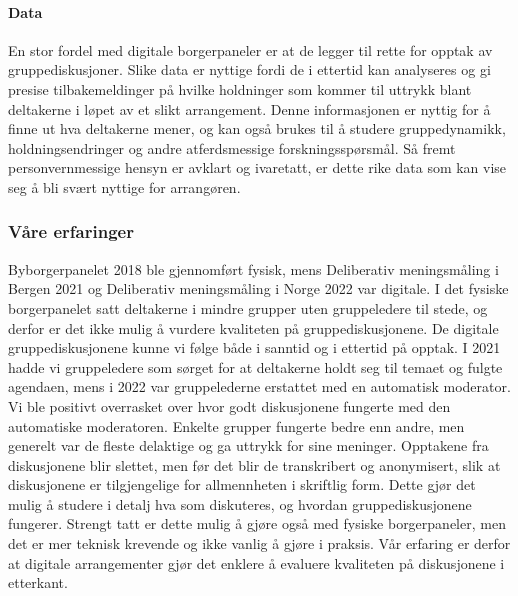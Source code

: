\documentclass[
  12pt,
  a4paper, 12pt]{article}
\begin{document}
\hypertarget{data}{%
\paragraph{Data}\label{data}}

En stor fordel med digitale borgerpaneler er at de legger til rette for opptak av gruppediskusjoner. Slike data er nyttige fordi de i ettertid kan analyseres og gi presise tilbakemeldinger på hvilke holdninger som kommer til uttrykk blant deltakerne i løpet av et slikt arrangement. Denne informasjonen er nyttig for å finne ut hva deltakerne mener, og kan også brukes til å studere gruppedynamikk, holdningsendringer og andre atferdsmessige forskningsspørsmål. Så fremt personvernmessige hensyn er avklart og ivaretatt, er dette rike data som kan vise seg å bli svært nyttige for arrangøren.

\hypertarget{vuxe5re-erfaringer-1}{%
\subsubsection{Våre erfaringer}\label{vuxe5re-erfaringer-1}}

Byborgerpanelet 2018 ble gjennomført fysisk, mens Deliberativ meningsmåling i Bergen 2021 og Deliberativ meningsmåling i Norge 2022 var digitale. I det fysiske borgerpanelet satt deltakerne i mindre grupper uten gruppeledere til stede, og derfor er det ikke mulig å vurdere kvaliteten på gruppediskusjonene. De digitale gruppediskusjonene kunne vi følge både i sanntid og i ettertid på opptak. I 2021 hadde vi gruppeledere som sørget for at deltakerne holdt seg til temaet og fulgte agendaen, mens i 2022 var gruppelederne erstattet med en automatisk moderator. Vi ble positivt overrasket over hvor godt diskusjonene fungerte med den automatiske moderatoren. Enkelte grupper fungerte bedre enn andre, men generelt var de fleste delaktige og ga uttrykk for sine meninger. Opptakene fra diskusjonene blir slettet, men før det blir de transkribert og anonymisert, slik at diskusjonene er tilgjengelige for allmennheten i skriftlig form. Dette gjør det mulig å studere i detalj hva som diskuteres, og hvordan gruppediskusjonene fungerer. Strengt tatt er dette mulig å gjøre også med fysiske borgerpaneler, men det er mer teknisk krevende og ikke vanlig å gjøre i praksis. Vår erfaring er derfor at digitale arrangementer gjør det enklere å evaluere kvaliteten på diskusjonene i etterkant.
\end{document}
